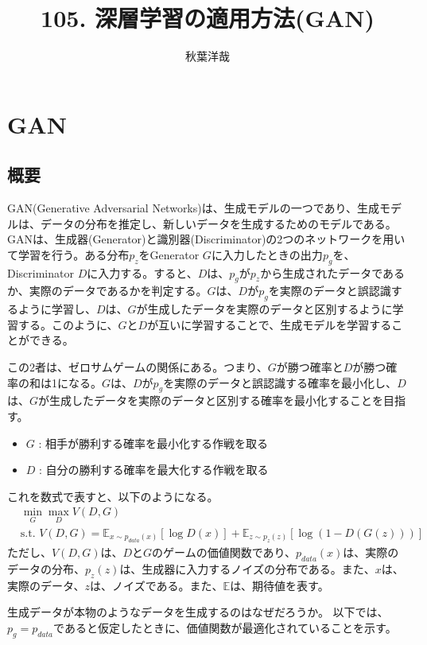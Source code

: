 \documentclass{ltjsarticle}
\begin{document}
\title{105. 深層学習の適用方法(GAN)}
\author{秋葉洋哉}
\maketitle

\section{GAN}
\subsection{概要}
GAN(Generative Adversarial Networks)は、生成モデルの一つであり、生成モデルは、データの分布を推定し、新しいデータを生成するためのモデルである。GANは、生成器(Generator)と識別器(Discriminator)の2つのネットワークを用いて学習を行う。ある分布$p_z$をGenerator $G$に入力したときの出力$p_g$を、Discriminator $D$に入力する。すると、$D$は、$p_g$が$p_z$から生成されたデータであるか、実際のデータであるかを判定する。$G$は、$D$が$p_g$を実際のデータと誤認識するように学習し、$D$は、$G$が生成したデータを実際のデータと区別するように学習する。このように、$G$と$D$が互いに学習することで、生成モデルを学習することができる。
\par
この2者は、ゼロサムゲームの関係にある。つまり、$G$が勝つ確率と$D$が勝つ確率の和は1になる。$G$は、$D$が$p_g$を実際のデータと誤認識する確率を最小化し、$D$は、$G$が生成したデータを実際のデータと区別する確率を最小化することを目指す。
\begin{itemize}
  \item $G$ : 相手が勝利する確率を最小化する作戦を取る
  \item $D$ : 自分の勝利する確率を最大化する作戦を取る
\end{itemize}
\par
これを数式で表すと、以下のようになる。
\begin{align}
  &\min_G \max_D V(D, G) \\
  \label{eq:V_GAN}
  &\text{s.t. } V(D, G) = \mathbb{E}_{x \sim p_{data}(x)}[\log D(x)] + \mathbb{E}_{z \sim p_z(z)}[\log(1 - D(G(z)))]
\end{align}
ただし、$V(D, G)$は、$D$と$G$のゲームの価値関数であり、$p_{data}(x)$は、実際のデータの分布、$p_z(z)$は、生成器に入力するノイズの分布である。また、$x$は、実際のデータ、$z$は、ノイズである。また、$\mathbb{E}$は、期待値を表す。
\par
生成データが本物のようなデータを生成するのはなぜだろうか。
以下では、$p_g = p_{data}$であると仮定したときに、価値関数が最適化されていることを示す。
\end{document}
